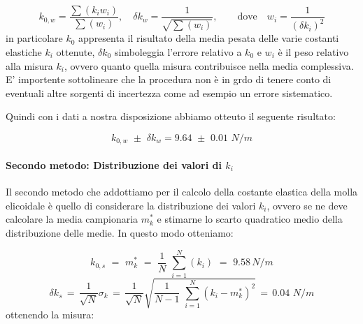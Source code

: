 \begin{equation*}
    k_{0,w} = \frac{\sum (k_i w_i)}{\sum (w_i)} , \quad \delta k_{w} = \frac{1}{\sqrt{\sum (w_i)}} , \qquad \text{dove} \quad w_i = \frac{1}{(\delta k_i)^2}
\end{equation*}
%
in particolare $k_0$ appresenta il risultato della media pesata delle varie costanti elastiche $k_i$ ottenute, $\delta k_0$ simboleggia l'errore relativo a $k_0$ e $w_i$ è il peso relativo alla misura $k_i$, ovvero quanto quella misura contribuisce nella media complessiva. E' importente sottolineare che la procedura non è in grdo di tenere conto di eventuali altre sorgenti di incertezza come ad esempio un errore sistematico.

Quindi con i dati a nostra disposizione abbiamo otteuto il seguente risultato:

\begin{equation}
    k_{0,w} \,\, \pm \,\, \delta k_{w} =  9.64 \,\, \pm \,\, 0.01 \,\,N/m
    \label{eq:w}
\end{equation}

\paragraph{Secondo metodo: Distribuzione dei valori di $k_i$\\}
Il secondo metodo che addottiamo per il calcolo della costante elastica della molla elicoidale è quello di considerare la distribuzione dei valori $k_i$, ovvero se ne deve calcolare la media campionaria $m^*_k$ e stimarne lo scarto quadratico medio della distribuzione delle medie. In questo modo otteniamo:

\begin{equation*}
    k_{0,s} \,\,=\,\, m^*_k \,\,=\,\, \frac{1}{N}\,\,\sum_{i=1}^{N} (k_i) \,\,=\,\, 9.58  \,N/m
\end{equation*}
%
\begin{equation*}
    \delta k_{s}  \,=\, \frac{1}{\sqrt{N}} \sigma_{k} \,=\, \frac{1}{\sqrt{N}}\sqrt{\frac{1}{N - 1}\,\,\sum_{i=1}^{N} (k_i - m^*_k)^2}\,=\, 0.04 \,\,N/m
\end{equation*}
%
ottenendo la misura:

